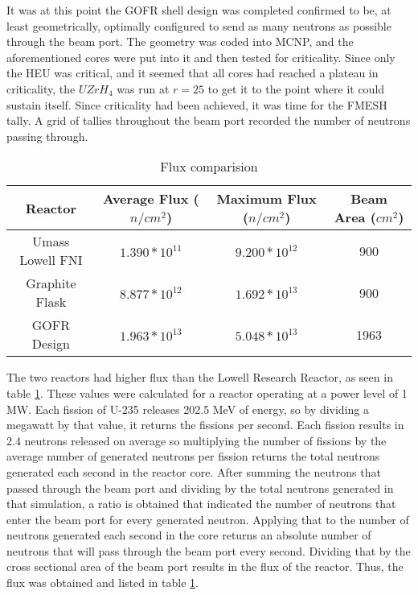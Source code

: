It was at this point the GOFR shell design was completed confirmed to be, at least geometrically, optimally configured to send as many neutrons as possible through the beam port. The geometry was coded into MCNP, and the aforementioned cores were put into it and then tested for criticality. Since only the HEU was critical, and it seemed that all cores had reached a plateau in criticality, the $UZrH_4$ was run at $r=25$ to get it to the point where it could sustain itself. Since criticality had been achieved, it was time for the FMESH tally. A grid of tallies throughout the beam port recorded the number of neutrons passing through. 

\begin{table}[!htbp]
\centering
\caption{Flux comparision}
\label{tab:flux}
\begin{tabular}{|c|c|c|c|}
\hline
Reactor			& Average Flux ($n/cm^2$)		& Maximum Flux ($n/cm^2$) & Beam Area ($cm^2$) \\
\hline
Umass Lowell FNI  	        & $1.390*10^11$           & $9.200*10^12$   &  900		\\
\hline
Graphite Flask				& $8.877*10^12$           & $1.692*10^13$   &  900		\\
\hline
GOFR Design 				& $1.963*10^13$           & $5.048*10^13$   & 1963		\\
\hline
\end{tabular}
\end{table}

The two reactors had higher flux than the Lowell Research Reactor, as seen in table \ref{tab:flux}. These values were calculated for a reactor operating at a power level of 1 MW. Each fission of U-235 releases 202.5 MeV of energy, so by dividing a megawatt by that value, it returns the fissions per second. Each fission results in 2.4 neutrons released on average so multiplying the number of fissions by the average number of generated neutrons per fission returns the total neutrons generated each second in the reactor core. After summing the neutrons that passed through the beam port and dividing by the total neutrons generated in that simulation, a ratio is obtained that indicated the number of neutrons that enter the beam port for every generated neutron. Applying that to the number of neutrons generated each second in the core returns an absolute number of neutrons that will pass through the beam port every second. Dividing that by the cross sectional area of the beam port results in the flux of the reactor. Thus, the flux was obtained and listed in table \ref{tab:flux}.\\

